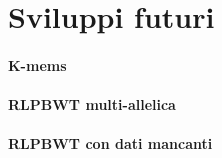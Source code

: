 \section{Sviluppi futuri}
\paragraph{K-mems}
\paragraph{RLPBWT multi-allelica}
\paragraph{RLPBWT con dati mancanti}